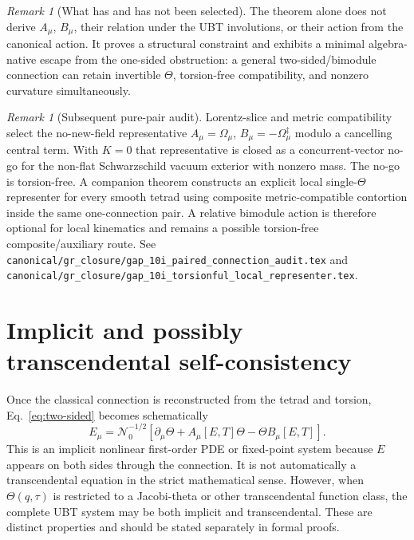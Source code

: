 \documentclass[12pt,a4paper]{article}
\theoremstyle{remark}\newtheorem{remark}[definition]{Remark}
\begin{document}
\begin{remark}[What has and has not been selected]
The theorem alone does not derive $A_\mu$, $B_\mu$, their relation under the
UBT involutions, or their action from the canonical action.  It proves a
structural constraint and exhibits a minimal algebra-native escape from the
one-sided obstruction: a general two-sided/bimodule connection can retain
invertible $\Theta$, torsion-free compatibility, and nonzero curvature
simultaneously.
\end{remark}

\begin{remark}[Subsequent pure-pair audit]
Lorentz-slice and metric compatibility select the no-new-field representative
$A_\mu=\Omega_\mu$, $B_\mu=-\Omega_\mu^\ddagger$ modulo a cancelling
central term.  With $K=0$ that representative is closed as a
concurrent-vector no-go for the non-flat Schwarzschild vacuum exterior with
nonzero mass.  The no-go is torsion-free.  A companion theorem constructs an
explicit local single-$\Theta$ representer for every smooth tetrad using
composite metric-compatible contortion inside the same one-connection pair.
A relative bimodule action is therefore optional for local kinematics and
remains a possible torsion-free composite/auxiliary route.  See
\texttt{canonical/gr\_closure/gap\_10i\_paired\_connection\_audit.tex} and
\texttt{canonical/gr\_closure/gap\_10i\_torsionful\_local\_representer.tex}.
\end{remark}

\section{Implicit and possibly transcendental self-consistency}
Once the classical connection is reconstructed from the tetrad and torsion,
Eq.~\eqref{eq:two-sided} becomes schematically
\begin{equation}
 E_\mu=\mathcal N_0^{-1/2}
 \left[
 \partial_\mu\Theta
 +A_\mu[E,T]\Theta
 -\Theta B_\mu[E,T]
 \right].
 \label{eq:fixed-point}
\end{equation}
This is an implicit nonlinear first-order PDE or fixed-point system because
$E$ appears on both sides through the connection.  It is not automatically a
transcendental equation in the strict mathematical sense.  However, when
$\Theta(q,\tau)$ is restricted to a Jacobi-theta or other transcendental
function class, the complete UBT system may be both implicit and
transcendental.  These are distinct properties and should be stated
separately in formal proofs.
\end{document}
